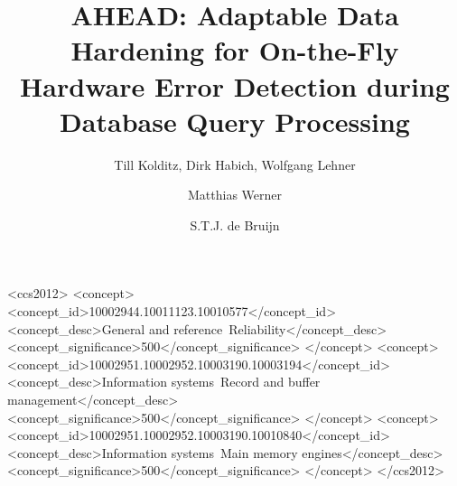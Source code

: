 \documentclass[format=sigconf,natbib=false]{acmart}
\providecommand\={}
\renewcommand{\=}[1][]{\hyp{}#1}
\begin{document}
\title[AHEAD: On-the-Fly Hardware Error Detection during Query Processing]{AHEAD: Adaptable Data Hardening for On-the-Fly Hardware Error Detection during Database Query Processing}

\author{Till Kolditz, Dirk Habich, Wolfgang Lehner}
\author{Matthias Werner}
\author{S.T.J. de Bruijn}
\renewcommand{\shortauthors}{Till Kolditz et al.}






%
%
\begin{CCSXML}
<ccs2012>
<concept>
<concept_id>10002944.10011123.10010577</concept_id>
<concept_desc>General and reference~Reliability</concept_desc>
<concept_significance>500</concept_significance>
</concept>
<concept>
<concept_id>10002951.10002952.10003190.10003194</concept_id>
<concept_desc>Information systems~Record and buffer management</concept_desc>
<concept_significance>500</concept_significance>
</concept>
<concept>
<concept_id>10002951.10002952.10003190.10010840</concept_id>
<concept_desc>Information systems~Main memory engines</concept_desc>
<concept_significance>500</concept_significance>
</concept>
</ccs2012>
\end{CCSXML}


\maketitle

%









\end{document}
